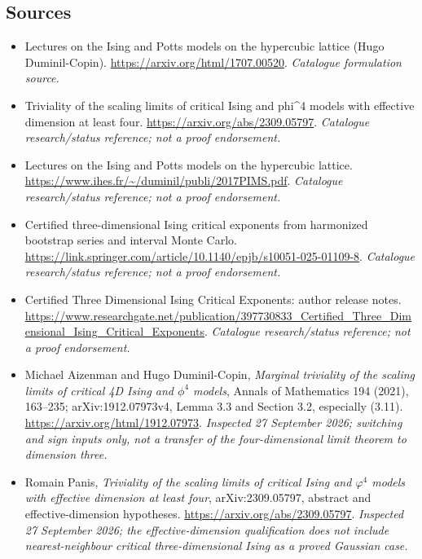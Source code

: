 \documentclass[11pt,a4paper]{article}
\numberwithin{equation}{section}
\begin{document}
\subsection{Sources}
\begin{itemize}\raggedright
\item[\textnormal{[S1]}]\hypertarget{source:73:1}{} Lectures on the Ising and Potts models on the hypercubic lattice (Hugo Duminil-Copin).
\url{https://arxiv.org/html/1707.00520}.
{\small\textit{Catalogue formulation source.}}
\item[\textnormal{[S2]}]\hypertarget{source:73:2}{} Triviality of the scaling limits of critical Ising and phi\textasciicircum{}4 models with effective dimension at least four.
\url{https://arxiv.org/abs/2309.05797}.
{\small\textit{Catalogue research/status reference; not a proof endorsement.}}
\item[\textnormal{[S3]}]\hypertarget{source:73:3}{} Lectures on the Ising and Potts models on the hypercubic lattice.
\url{https://www.ihes.fr/~/duminil/publi/2017PIMS.pdf}.
{\small\textit{Catalogue research/status reference; not a proof endorsement.}}
\item[\textnormal{[S4]}]\hypertarget{source:73:4}{} Certified three-dimensional Ising critical exponents from harmonized bootstrap series and interval Monte Carlo.
\url{https://link.springer.com/article/10.1140/epjb/s10051-025-01109-8}.
{\small\textit{Catalogue research/status reference; not a proof endorsement.}}
\item[\textnormal{[S5]}]\hypertarget{source:73:5}{} Certified Three Dimensional Ising Critical Exponents: author release notes.
\url{https://www.researchgate.net/publication/397730833_Certified_Three_Dimensional_Ising_Critical_Exponents}.
{\small\textit{Catalogue research/status reference; not a proof endorsement.}}
\item[\textnormal{[E1]}]\hypertarget{extra:73:1}{} Michael Aizenman and
Hugo Duminil-Copin, \emph{Marginal triviality of the scaling limits of
critical 4D Ising and $\phi^4$ models}, Annals of Mathematics 194 (2021),
163--235; arXiv:1912.07973v4, Lemma 3.3 and Section 3.2, especially (3.11).
\url{https://arxiv.org/html/1912.07973}.
{\small\textit{Inspected 27 September 2026; switching and sign inputs only,
not a transfer of the four-dimensional limit theorem to dimension three.}}
\item[\textnormal{[E2]}]\hypertarget{extra:73:2}{} Romain Panis,
\emph{Triviality of the scaling limits of critical Ising and $\varphi^4$
models with effective dimension at least four}, arXiv:2309.05797,
abstract and effective-dimension hypotheses.
\url{https://arxiv.org/abs/2309.05797}.
{\small\textit{Inspected 27 September 2026; the effective-dimension
qualification does not include nearest-neighbour critical three-dimensional
Ising as a proved Gaussian case.}}
\end{itemize}
\end{document}
